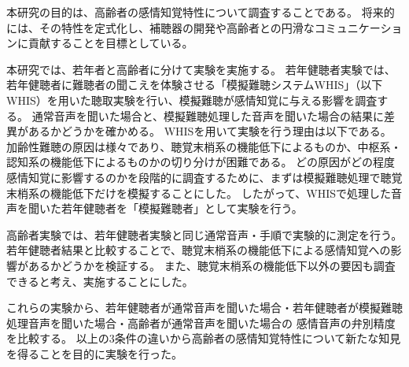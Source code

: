 本研究の目的は、高齢者の感情知覚特性について調査することである。
将来的には、その特性を定式化し、補聴器の開発や高齢者との円滑なコミュニケーションに貢献することを目標としている。

本研究では、若年者と高齢者に分けて実験を実施する。
若年健聴者実験では、
若年健聴者に難聴者の聞こえを体験させる「模擬難聴システムWHIS」（以下WHIS）を用いた聴取実験を行い、模擬難聴が感情知覚に与える影響を調査する。
通常音声を聞いた場合と、模擬難聴処理した音声を聞いた場合の結果に差異があるかどうかを確かめる。
WHISを用いて実験を行う理由は以下である。
加齢性難聴の原因は様々であり、聴覚末梢系の機能低下によるものか、中枢系・認知系の機能低下によるものかの切り分けが困難である。
どの原因がどの程度感情知覚に影響するのかを段階的に調査するために、まずは模擬難聴処理で聴覚末梢系の機能低下だけを模擬することにした。
したがって、WHISで処理した音声を聞いた若年健聴者を「模擬難聴者」として実験を行う。

高齢者実験では、若年健聴者実験と同じ通常音声・手順で実験的に測定を行う。
若年健聴者結果と比較することで、聴覚末梢系の機能低下による感情知覚への影響があるかどうかを検証する。
また、聴覚末梢系の機能低下以外の要因も調査できると考え、実施することにした。

これらの実験から、若年健聴者が通常音声を聞いた場合・若年健聴者が模擬難聴処理音声を聞いた場合・高齢者が通常音声を聞いた場合の
感情音声の弁別精度を比較する。
以上の3条件の違いから高齢者の感情知覚特性について新たな知見を得ることを目的に実験を行った。







